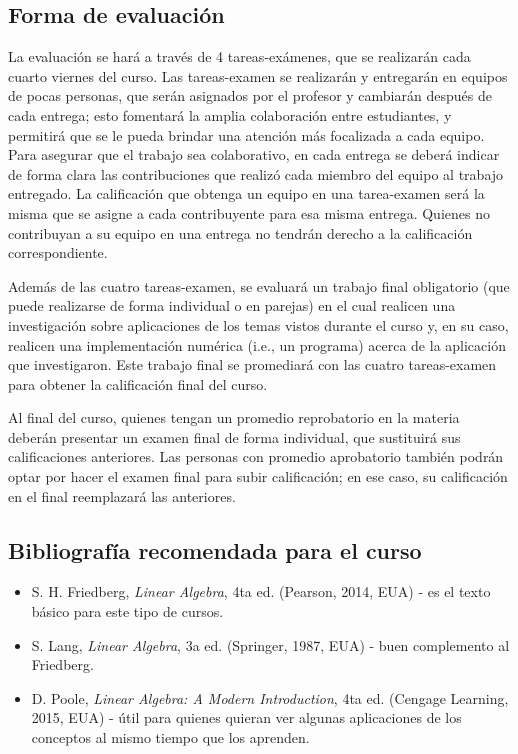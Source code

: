 \documentclass[12pt,dvipsnames]{article}
\begin{document}
\subsection{Forma de evaluación}

 La evaluación se hará a través de 4 tareas-exámenes, que se realizarán cada cuarto viernes del curso. Las tareas-examen se realizarán y entregarán en equipos de pocas personas, que serán asignados por el profesor y cambiarán después de cada entrega; esto fomentará la amplia colaboración entre estudiantes, y permitirá que se le pueda brindar una atención más focalizada a cada equipo. Para asegurar que el trabajo sea colaborativo, en cada entrega se deberá indicar de forma clara las contribuciones que realizó cada miembro del equipo al trabajo entregado. La calificación que obtenga un equipo en una tarea-examen será la misma que se asigne a cada contribuyente para esa misma entrega. Quienes no contribuyan a su equipo en una entrega no tendrán derecho a la calificación correspondiente.

Además de las cuatro tareas-examen, se evaluará un trabajo final obligatorio (que puede realizarse de forma individual o en parejas) en el cual realicen una investigación sobre aplicaciones de los temas vistos durante el curso y, en su caso, realicen una implementación numérica (i.e., un programa) acerca de la aplicación que investigaron. Este trabajo final se promediará con las cuatro tareas-examen para obtener la calificación final del curso.

Al final del curso, quienes tengan un promedio reprobatorio en la materia deberán presentar un examen final de forma individual, que sustituirá sus calificaciones anteriores. Las personas con promedio aprobatorio también podrán optar por hacer el examen final para subir calificación; en ese caso, su calificación en el final reemplazará las anteriores.

\subsection{Bibliografía recomendada para el curso} \label{Bibliografía}

\begin{itemize}
    \item S. H. Friedberg, \emph{Linear Algebra}, 4ta ed. (Pearson, 2014, EUA) - es el texto básico para este tipo de cursos.
    \item S. Lang, \emph{Linear Algebra}, 3a ed. (Springer, 1987, EUA) - buen complemento al Friedberg.
    \item D. Poole, \emph{Linear Algebra: A Modern Introduction}, 4ta ed. (Cengage Learning, 2015, EUA) - útil para quienes quieran ver algunas aplicaciones de los conceptos al mismo tiempo que los aprenden.
\end{itemize}{}
\end{document}
